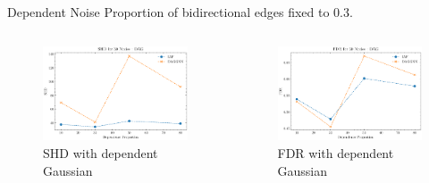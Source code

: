 \documentclass{beamer}
\begin{document}
\begin{frame}[allowframebreaks]{Dependent Noise}
    Proportion of bidirectional edges fixed to 0.3.
    \begin{columns}
        \begin{column}{0.5\textwidth}
            \begin{figure}
                \centering
                \includegraphics[width=\textwidth]{fig/SHD_dependence_30_DAG_threshold0.3.pdf}
                \caption{SHD with dependent Gaussian}
                \label{fig:dep_gaussian_shd}
            \end{figure}
        \end{column}
        \begin{column}{0.5\textwidth}
            \begin{figure}
                \centering
                \includegraphics[width=\textwidth]{fig/FDR_dependence_30_DAG_threshold0.3.pdf}
                \caption{FDR with dependent Gaussian}
                \label{fig:dep_gaussian_fdr}
            \end{figure}
        \end{column}
    \end{columns}


\end{frame}
\end{document}
